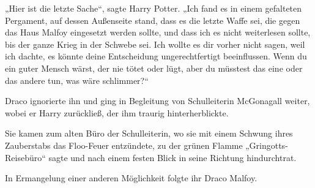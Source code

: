 „Hier ist die letzte Sache“, sagte Harry Potter. „Ich fand es in einem gefalteten Pergament, auf dessen Außenseite stand, dass es die letzte Waffe sei, die gegen das Haus Malfoy eingesetzt werden sollte, und dass ich es nicht weiterlesen sollte, bis der ganze Krieg in der Schwebe sei. Ich wollte es dir vorher nicht sagen, weil ich dachte, es könnte deine Entscheidung ungerechtfertigt beeinflussen. Wenn du ein guter Mensch wärst, der nie tötet oder lügt, aber du müsstest das eine oder das andere tun, was wäre schlimmer?“

Draco ignorierte ihn und ging in Begleitung von Schulleiterin McGonagall weiter, wobei er Harry zurückließ, der ihm traurig hinterherblickte.

Sie kamen zum alten Büro der Schulleiterin, wo sie mit einem Schwung ihres Zauberstabs das Floo-Feuer entzündete, zu der grünen Flamme „Gringotts-Reisebüro“ sagte und nach einem festen Blick in seine Richtung hindurchtrat.

In Ermangelung einer anderen Möglichkeit folgte ihr Draco Malfoy.

\later

